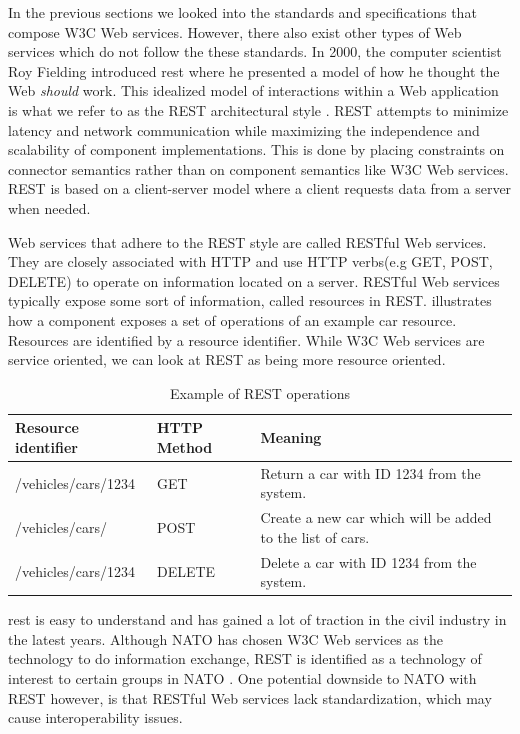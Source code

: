 In the previous sections we looked into the standards and specifications that
compose W3C Web services. However, there also exist other types of Web services
which do not follow the these standards. In 2000, the computer scientist Roy
Fielding introduced \gls{rest} where he presented a model of how he thought the
Web \textit{should} work. This idealized model of interactions within a Web
application is what we refer to as the REST architectural style
\cite{rest-fielding}. REST attempts to minimize latency and network
communication while maximizing the independence and scalability of component
implementations. This is done by placing constraints on connector semantics
rather than on component semantics like W3C Web services.  REST is based on a
client-server model where a client requests data from a server when needed.

Web services that adhere to the REST style are called RESTful Web services. They
are closely associated with HTTP and use HTTP verbs(e.g GET, POST, DELETE) to
operate on information located on a server. RESTful Web services typically
expose some sort of information, called resources in REST. 
illustrates how a component exposes a set of operations of an example car
resource. Resources are identified by a resource identifier. While W3C Web
services are service oriented, we can look at REST as being more resource
oriented.

 \begin{table}[h]
 \begin{tabularx}{\textwidth}{| X | X | X |}
 \hline
   \textbf{Resource identifier} & \textbf{HTTP Method}  & \textbf{Meaning}\\ \hline
   /vehicles/cars/1234 & GET & Return a car with ID 1234 from the system. \\ \hline
   /vehicles/cars/ & POST & Create a new car which will be added to the list of cars. \\ \hline
   /vehicles/cars/1234 & DELETE & Delete a car with ID 1234 from the system. \\ \hline
 \end{tabularx}
 \caption{Example of REST operations}
 \label{table-rest}
 \end{table}

 \gls{rest} is easy to understand and has gained a lot of traction in the civil
 industry in the latest years. Although NATO has chosen W3C Web services as the
 technology to do information exchange, REST is identified as a technology of
 interest to certain groups in NATO \cite{johnsen-recommendations}. One potential
 downside to NATO with REST however, is that RESTful Web services lack
 standardization, which may cause interoperability issues.

